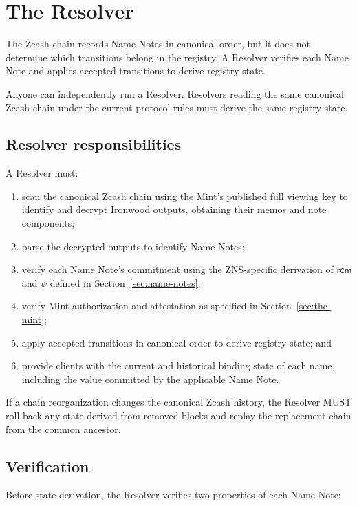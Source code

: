 \section{The Resolver}
\label{sec:resolver}

The Zcash chain records Name Notes in canonical order, but it does not determine which transitions belong in the registry. A Resolver verifies each Name Note and applies accepted transitions to derive registry state.

Anyone can independently run a Resolver. Resolvers reading the same canonical Zcash chain under the current protocol rules must derive the same registry state.

\subsection{Resolver responsibilities}

A Resolver must:

\begin{enumerate}
  \item scan the canonical Zcash chain using the Mint's published full viewing key to identify and decrypt Ironwood outputs, obtaining their memos and note components;
  \item parse the decrypted outputs to identify Name Notes;
  \item verify each Name Note's commitment using the ZNS-specific derivation of $\mathsf{rcm}$ and $\psi$ defined in Section~\ref{sec:name-notes};
  \item verify Mint authorization and attestation as specified in Section~\ref{sec:the-mint};
  \item apply accepted transitions in canonical order to derive registry state; and
  \item provide clients with the current and historical binding state of each name, including the  value committed by the applicable Name Note.
\end{enumerate}

If a chain reorganization changes the canonical Zcash history, the Resolver MUST roll back any state derived from removed blocks and replay the replacement chain from the common ancestor.

\subsection{Verification}

Before state derivation, the Resolver verifies two properties of each Name Note:

